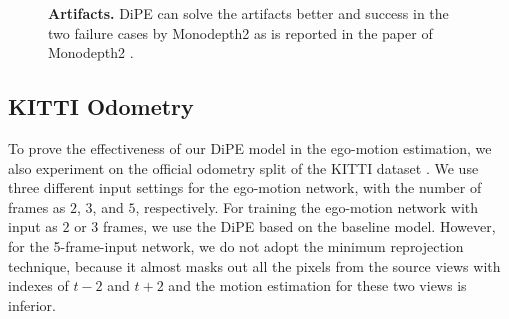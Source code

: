 \documentclass[letterpaper, 10 pt, conference]{ieeeconf}
\begin{document}
\begin{figure}
\centering
\hspace{-10pt}
\caption{{\bf Artifacts.} DiPE can solve the artifacts better and success in the two failure cases by Monodepth2 as is reported in the paper of Monodepth2 \cite{godard2019digging}. }
\vspace{-2pt}
\label{fig:artifacts}
\end{figure}


\subsection{KITTI Odometry}
To prove the effectiveness of our DiPE model in the ego-motion estimation, we also experiment on the official odometry split of the KITTI dataset \cite{geiger2013vision}. We use three different input settings for the ego-motion network, with the number of frames as $2$, $3$, and $5$, respectively. For training the ego-motion network with input as $2$ or $3$ frames, we use the DiPE based on the baseline model. However, for the 5-frame-input network, we do not adopt the minimum reprojection technique, because it almost masks out all the pixels from the source views with indexes of $t-2$ and $t+2$ and the motion estimation for these two views is inferior. 
\end{document}
